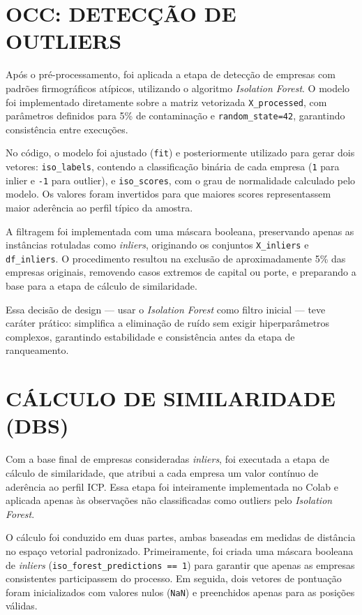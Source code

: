 \section{OCC: DETECÇÃO DE OUTLIERS}

Após o pré-processamento, foi aplicada a etapa de detecção de empresas com padrões firmográficos atípicos, utilizando o algoritmo \textit{Isolation Forest}. O modelo foi implementado diretamente sobre a matriz vetorizada \texttt{X\_processed}, com parâmetros definidos para 5\% de contaminação e \texttt{random\_state=42}, garantindo consistência entre execuções.

No código, o modelo foi ajustado (\texttt{fit}) e posteriormente utilizado para gerar dois vetores: \texttt{iso\_labels}, contendo a classificação binária de cada empresa (\texttt{1} para inlier e \texttt{-1} para outlier), e \texttt{iso\_scores}, com o grau de normalidade calculado pelo modelo. Os valores foram invertidos para que maiores scores representassem maior aderência ao perfil típico da amostra.

A filtragem foi implementada com uma máscara booleana, preservando apenas as instâncias rotuladas como \textit{inliers}, originando os conjuntos \texttt{X\_inliers} e \texttt{df\_inliers}. O procedimento resultou na exclusão de aproximadamente 5\% das empresas originais, removendo casos extremos de capital ou porte, e preparando a base para a etapa de cálculo de similaridade.

Essa decisão de design — usar o \textit{Isolation Forest} como filtro inicial — teve caráter prático: simplifica a eliminação de ruído sem exigir hiperparâmetros complexos, garantindo estabilidade e consistência antes da etapa de ranqueamento.

\section{CÁLCULO DE SIMILARIDADE (DBS)}

Com a base final de empresas consideradas \textit{inliers}, foi executada a etapa de cálculo de similaridade, que atribui a cada empresa um valor contínuo de aderência ao perfil ICP. Essa etapa foi inteiramente implementada no Colab e aplicada apenas às observações não classificadas como outliers pelo \textit{Isolation Forest}.

O cálculo foi conduzido em duas partes, ambas baseadas em medidas de distância no espaço vetorial padronizado. Primeiramente, foi criada uma máscara booleana de \textit{inliers} (\texttt{iso\_forest\_predictions == 1}) para garantir que apenas as empresas consistentes participassem do processo. Em seguida, dois vetores de pontuação foram inicializados com valores nulos (\texttt{NaN}) e preenchidos apenas para as posições válidas.

